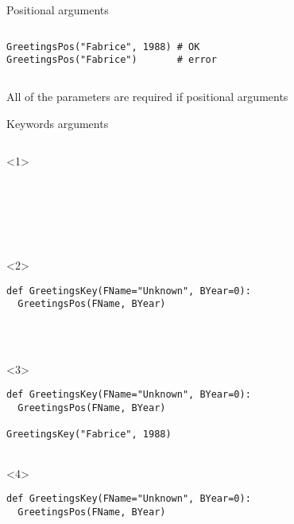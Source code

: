 \begin{frame}[fragile]{Positional arguments}
\begin{columns}[onlytextwidth]
\begin{column}{\textwidth}
\begin{onlyenv}
\begin{lstlisting}[style=python]
GreetingsPos("Fabrice", 1988) # OK
GreetingsPos("Fabrice")       # error \end{lstlisting}
      \end{onlyenv}

    \end{column}
  \end{columns}

   All of the parameters are required if positional arguments

\end{frame}



\begin{frame}[fragile]{Keywords arguments}

  \begin{columns}[onlytextwidth]
    \begin{column}{\textwidth}

      \begin{onlyenv}<1>
        \begin{lstlisting}[style=python]






 \end{lstlisting}
      \end{onlyenv}

      \begin{onlyenv}<2>
        \begin{lstlisting}[style=python]
def GreetingsKey(FName="Unknown", BYear=0):
  GreetingsPos(FName, BYear)




 \end{lstlisting}
      \end{onlyenv}

      \begin{onlyenv}<3>
        \begin{lstlisting}[style=python]
def GreetingsKey(FName="Unknown", BYear=0):
  GreetingsPos(FName, BYear)

GreetingsKey("Fabrice", 1988)


 \end{lstlisting}
      \end{onlyenv}

      \begin{onlyenv}<4>
        \begin{lstlisting}[style=python]
def GreetingsKey(FName="Unknown", BYear=0):
  GreetingsPos(FName, BYear)


\end{lstlisting}
\end{onlyenv}
\end{column}
\end{columns}
\end{frame}
